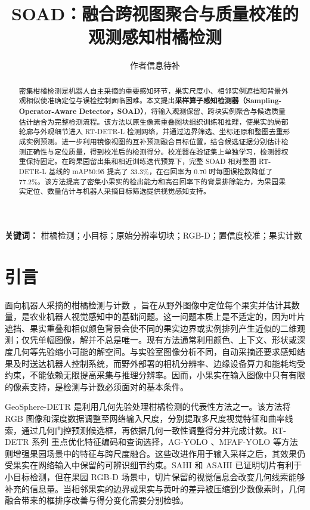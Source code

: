 \documentclass[11pt,a4paper]{ctexart}
\title{SOAD：融合跨视图聚合与质量校准的观测感知柑橘检测}
\author{作者信息待补}
\date{}
\begin{document}
\maketitle

\begin{abstract}
密集柑橘检测是机器人自主采摘的重要感知环节，果实尺度小、相邻实例遮挡和背景外观相似使准确定位与误检控制面临困难。本文提出\textbf{采样算子感知检测器（Sampling-Operator-Aware Detector，SOAD）}，将输入观测保留、跨块实例聚合与候选质量估计结合为完整检测流程。该方法以原生像素重叠图块组织训练和推理，使果实的局部轮廓与外观细节进入 RT-DETR-L 检测网络，并通过边界筛选、坐标还原和整图去重形成实例预测。进一步利用镜像视图的互补预测融合目标位置，结合候选证据分别估计检测正确性与定位质量，得到校准后的检测得分。校准器在验证集上单独学习，检测器权重保持固定。在跨果园留出集和相近训练迭代预算下，完整 SOAD 相对整图 RT-DETR-L 基线的 mAP50:95 提高了 33.3\%，在召回率为 0.70 时每图误检数降低了 77.2\%。该方法提高了密集小果实的检出能力和高召回率下的背景排除能力，为果园果实定位、数量估计与机器人采摘目标筛选提供视觉感知支持。
\end{abstract}
\textbf{关键词：} 柑橘检测；小目标；原始分辨率切块；RGB-D；置信度校准；果实计数

\section{引言}
面向机器人采摘的柑橘检测与计数 \cite{agyolo,mfaf,geosphere}，旨在从野外图像中定位每个果实并估计其数量，是农业机器人视觉感知中的基础问题。这一问题本质上是不适定的，因为叶片遮挡、果实重叠和相似颜色背景会使不同的果实边界或实例排列产生近似的二维观测；仅凭单幅图像，解并不总是唯一。现有方法通常利用颜色、上下文、形状或深度几何等先验缩小可能的解空间。与实验室图像分析不同，自动采摘还要求感知结果及时送达机器人控制系统，而野外部署的相机分辨率、边缘设备算力和能耗均受约束，不能依赖无限提高采集与推理分辨率。因而，小果实在输入图像中只有有限的像素支持，是检测与计数必须面对的基本条件。

GeoSphere-DETR \cite{geosphere} 是利用几何先验处理柑橘检测的代表性方法之一。该方法将 RGB 图像和深度数据调整至网络输入尺度，分别提取多尺度视觉特征和曲率线索，通过几何门控预测候选框，再依据几何一致性调整得分并完成计数。RT-DETR 系列 \cite{rtdetr,rtdetrv2} 重点优化特征编码和查询选择，AG-YOLO \cite{agyolo}、MFAF-YOLO \cite{mfaf} 等方法则增强果园场景中的特征与跨尺度融合。这些改进作用于输入采样之后，其效果仍受果实在网络输入中保留的可辨识细节约束。SAHI \cite{sahi} 和 ASAHI \cite{asahi} 已证明切片有利于小目标检测，但在果园 RGB-D 场景中，切片保留的视觉信息会改变几何线索能够补充的信息量。当相邻果实的边界或果实与黄叶的差异被压缩到少数像素时，几何融合带来的框排序改善与得分变化需要分别检验。
\end{document}
